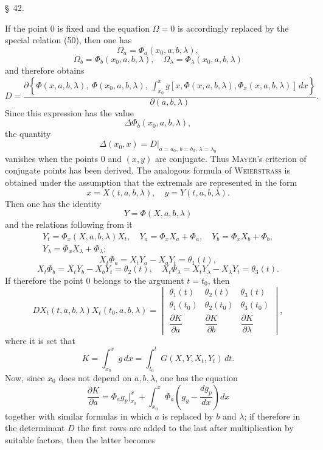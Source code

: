 \documentclass[11pt,a4paper,leqno]{article}
\begin{document}
\begin{center}
{\large \S~42.}
\end{center}

If the point 0 is fixed and the equation $\Omega=0$ is accordingly replaced by the special relation (50), then one has
\[
\Omega_a=\Phi_a(x_0,a,b,\lambda),
\]
\[
\Omega_b=\Phi_b(x_0,a,b,\lambda),
\quad
\Omega_\lambda=\Phi_\lambda(x_0,a,b,\lambda)
\]
and therefore obtains
\[
D=\frac{\partial\left\{\Phi(x,a,b,\lambda),\ \Phi(x_0,a,b,\lambda),\ \displaystyle\int_{x_0}^{x}g[x,\Phi(x,a,b,\lambda),\Phi_x(x,a,b,\lambda)]\,dx\right\}}{\partial(a,b,\lambda)}.
\]
Since this expression has the value
\[
\Delta\Phi_b(x_0,a,b,\lambda),
\]
the quantity
\[
\Delta(x_0,x)=D\big|_{a=a_0,\,b=b_0,\,\lambda=\lambda_0}
\]
vanishes when the points 0 and $(x,y)$ are conjugate. Thus \textsc{Mayer}'s criterion of conjugate points has been derived. The analogous formula of \textsc{Weierstrass} is obtained under the assumption that the extremals are represented in the form
\begin{equation}\tag{57}
x=X(t,a,b,\lambda),
\quad y=Y(t,a,b,\lambda).
\end{equation}
Then one has the identity
\[
Y=\Phi(X,a,b,\lambda)
\]
and the relations following from it
\[
\begin{gathered}
Y_t=\Phi_x(X,a,b,\lambda)X_t,
\quad Y_a=\Phi_xX_a+\Phi_a,
\quad Y_b=\Phi_xX_b+\Phi_b,\\
Y_\lambda=\Phi_xX_\lambda+\Phi_\lambda;
\end{gathered}
\]
\[
X_t\Phi_a=X_tY_a-X_aY_t=\theta_1(t),
\]
\[
X_t\Phi_b=X_tY_b-X_bY_t=\theta_2(t),
\quad
X_t\Phi_\lambda=X_tY_\lambda-X_\lambda Y_t=\theta_3(t).
\]
If therefore the point 0 belongs to the argument $t=t_0$, then
\[
D X_t(t,a,b,\lambda)X_t(t_0,a,b,\lambda)=
\begin{vmatrix}
\theta_1(t)&\theta_2(t)&\theta_3(t)\\
\theta_1(t_0)&\theta_2(t_0)&\theta_3(t_0)\\[.6ex]
\dfrac{\partial K}{\partial a}&\dfrac{\partial K}{\partial b}&\dfrac{\partial K}{\partial\lambda}
\end{vmatrix},
\]
where it is set that
\[
K=\int_{x_0}^{x}g\,dx=\int_{t_0}^{t}G(X,Y,X_t,Y_t)\,dt.
\]
Now, since $x_0$ does not depend on $a,b,\lambda$, one has the equation
\[
\frac{\partial K}{\partial a}=\Phi_a g_p\bigg|_{x_0}^{x}+\int_{x_0}^{x}\Phi_a\left(g_y-\frac{dg_p}{dx}\right)dx
\]
together with similar formulas in which $a$ is replaced by $b$ and $\lambda$; if therefore in the determinant $D$ the first rows are added to the last after multiplication by suitable factors, then the latter becomes
\end{document}
